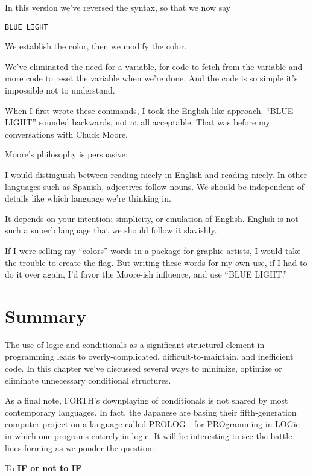 In this version we've reversed the syntax, so that we now say

\begin{verbatim}
BLUE LIGHT
\end{verbatim}

We establish the color, then we modify the color.

We've eliminated the need for a variable, for code to fetch from the
variable and more code to reset the variable when we're done. And the
code is so simple it's impossible not to understand.

When I first wrote these commands, I took the English-like approach.
``BLUE LIGHT'' sounded backwards, not at all acceptable. That
was before my conversations with Chuck Moore.

Moore's philosophy is persuasive:

I would distinguish between reading nicely in English and reading nicely.
In other languages such as Spanish, adjectives follow nouns. We should be
independent of details like which language we're thinking in.

It depends on your intention: simplicity, or emulation of English. English is
not such a superb language that we should follow it slavishly.

If I were selling my ``colors'' words in a package for graphic artists, I
would take the trouble to create the flag. But writing these words for my
own use, if I had to do it over again, I'd favor the Moore-ish influence,
and use ``BLUE LIGHT.''

\section{Summary}

The use of logic and conditionals as a significant structural element in
programming leads to overly-complicated, difficult-to-maintain, and
inefficient code. In this chapter we've discussed several ways to minimize,
optimize or eliminate unnecessary conditional structures.

As a final note, FORTH's downplaying of conditionals is not shared
by most contemporary languages. In fact, the Japanese are basing their
fifth-generation computer project on a language called PROLOG---for
PROgramming in LOGic---in which one programs entirely in logic. It will
be interesting to see the battle-lines forming as we ponder the question:

To \bf{IF} or not to \bf{IF}

